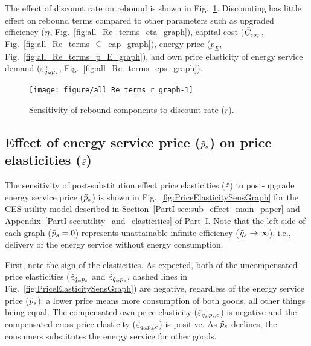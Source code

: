 \documentclass[12pt]{article}\usepackage[]{graphicx}\usepackage[]{xcolor}
\newenvironment{knitrout}{}{} %
\begin{document}
The effect of discount rate on rebound is shown in Fig.~\ref{fig:all_Re_terms_r_graph}.
Discounting has little effect on rebound terms
compared to other parameters such as
upgraded efficiency ($\tilde{\eta}$, Fig.~\ref{fig:all_Re_terms_eta_graph}), 
capital cost ($\tilde{C}_{cap}$, Fig.~\ref{fig:all_Re_terms_C_cap_graph}), 
energy price ($p_E$, Fig.~\ref{fig:all_Re_terms_p_E_graph}), and 
own price elasticity of energy service demand 
($\varepsilon^\circ_{\dot{q}_s\!,p_s}$, Fig.~\ref{fig:all_Re_terms_eps_graph}).

\begin{knitrout}
\color{fgcolor}\begin{figure}

{\centering \texttt{[image: figure/all\_Re\_terms\_r\_graph-1]} 

}

\caption[Sensitivity of rebound components to discount rate ($r$)]{Sensitivity of rebound components to discount rate ($r$).}\label{fig:all_Re_terms_r_graph}
\end{figure}

\end{knitrout}


\subsection{Effect of energy service price ($\tilde{p}_s$) on price elasticities ($\hat{\varepsilon}$)}
\label{sec:price_elasticities_sensitivity}

The sensitivity of post-substitution effect price elasticities ($\hat{\varepsilon}$)
to post-upgrade energy service price ($\tilde{p}_s$)
is shown in Fig.~\ref{fig:PriceElasticitySensGraph}
for the CES utility model described 
in Section~\ref{PartI-sec:sub_effect_main_paper} 
and Appendix~\ref{PartI-sec:utility_and_elasticities}
of Part~I.
Note that the left side of each graph ($\tilde{p}_{s} = 0$)
represents unattainable infinite efficiency ($\tilde{\eta}_s \rightarrow \infty$), 
i.e., delivery of the energy service without energy consumption.

First, note the sign of the elasticities. As expected, both of the
uncompensated price elasticities ($\hat{\varepsilon}_{\dot{q}_s\!,p_s}$ and $\hat{\varepsilon}_{\dot{q}_o\!,p_s}$,
dashed lines in Fig.~\ref{fig:PriceElasticitySensGraph}) 
are negative, regardless of the energy service price ($\tilde{p}_s$):
a lower price means more consumption of both
goods, all other things being equal.
The compensated own price elasticity ($\hat{\varepsilon}_{\dot{q}_s\!,p_s\!,c}$) is negative
and the compensated cross price elasticity ($\hat{\varepsilon}_{\dot{q}_o\!,p_s\!,c}$) is positive.
As $\tilde{p}_s$ declines, the consumers substitutes the energy
service for other goods.
\end{document}
